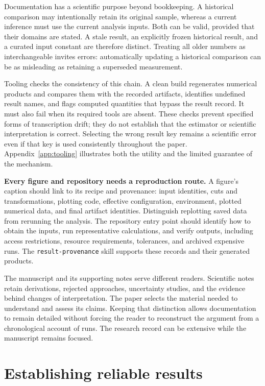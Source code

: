 \documentclass[aps,prd,reprint,nofootinbib]{revtex4-2}
\begin{document}
Documentation has a scientific purpose beyond bookkeeping. A historical comparison may intentionally retain its original sample, whereas a current inference must use the current analysis inputs. Both can be valid, provided that their domains are stated. A stale result, an explicitly frozen historical result, and a curated input constant are therefore distinct. Treating all older numbers as interchangeable invites errors: automatically updating a historical comparison can be as misleading as retaining a superseded measurement.

Tooling checks the consistency of this chain. A clean build regenerates numerical products and compares them with the recorded artifacts, identifies undefined result names, and flags computed quantities that bypass the result record. It must also fail when its required tools are absent. These checks prevent specified forms of transcription drift; they do not establish that the estimator or scientific interpretation is correct. Selecting the wrong result key remains a scientific error even if that key is used consistently throughout the paper. Appendix~\ref{app:tooling} illustrates both the utility and the limited guarantee of the mechanism.

\textbf{Every figure and repository needs a reproduction route.} A figure's caption should link to its recipe and provenance: input identities, cuts and transformations, plotting code, effective configuration, environment, plotted numerical data, and final artifact identities. Distinguish replotting saved data from rerunning the analysis. The repository entry point should identify how to obtain the inputs, run representative calculations, and verify outputs, including access restrictions, resource requirements, tolerances, and archived expensive runs. The \texttt{result-provenance} skill supports these records and their generated products.

The manuscript and its supporting notes serve different readers. Scientific notes retain derivations, rejected approaches, uncertainty studies, and the evidence behind changes of interpretation. The paper selects the material needed to understand and assess its claims. Keeping that distinction allows documentation to remain detailed without forcing the reader to reconstruct the argument from a chronological account of runs. The research record can be extensive while the manuscript remains focused.

\section{Establishing reliable results}\label{sec:reliability}
\end{document}
